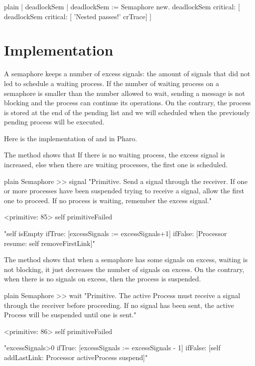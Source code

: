 \documentclass[10pt,twoside,english]{_support/latex/sbabook/sbabook}
\begin{document}
\begin{displaycode}{plain}
| deadlockSem |
deadlockSem := Semaphore new. 
deadlockSem critical: [ deadlockSem critical: [ 'Nested passes!' crTrace] ]
\end{displaycode}
\section{Implementation }
A semaphore keeps a number of excess signals: the amount of signals that did not led to schedule a waiting process.
If the number of waiting process on a semaphore is smaller than the number allowed to wait, sending a  message is not blocking and the process can continue its operations. 
On the contrary, the process is stored at the end of the pending list and we will scheduled when the previously pending process will be executed.

Here is the implementation of  and  in Pharo.

The  method shows that If there is no waiting process, the excess signal is increased, else when there are waiting processes, the first one is scheduled.

\begin{displaycode}{plain}
Semaphore >> signal
	"Primitive. Send a signal through the receiver. If one or more processes 
	have been suspended trying to receive a signal, allow the first one to 
	proceed. If no process is waiting, remember the excess signal."

	<primitive: 85>
	self primitiveFailed

	"self isEmpty    
		ifTrue: [excessSignals := excessSignals+1]    
		ifFalse: [Processor resume: self removeFirstLink]"
\end{displaycode}

The  method shows that when a semaphore has some signals on excess, waiting is not blocking, it just decreases the number of signals on excess. 
On the contrary, when there is no signals on excess, then the process is suspended.

\begin{displaycode}{plain}
Semaphore >> wait
	"Primitive. The active Process must receive a signal through the receiver 
	before proceeding. If no signal has been sent, the active Process will be 
	suspended until one is sent."

	<primitive: 86>
	self primitiveFailed

	"excessSignals>0  
		ifTrue: [excessSignals := excessSignals - 1]  
		ifFalse: [self addLastLink: Processor activeProcess suspend]"
\end{displaycode}
\end{document}
